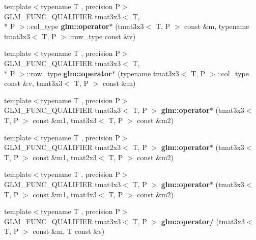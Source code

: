 \begin{DoxyCompactItemize}
\item 
\hypertarget{namespaceglm_a063060eed26a69cbc69ffd13b78263fd}{{\footnotesize template$<$typename T , precision P$>$ }\\G\-L\-M\-\_\-\-F\-U\-N\-C\-\_\-\-Q\-U\-A\-L\-I\-F\-I\-E\-R tmat3x3$<$ T, \\*
P $>$\-::col\-\_\-type {\bfseries glm\-::operator$\ast$} (tmat3x3$<$ T, P $>$ const \&m, typename tmat3x3$<$ T, P $>$\-::row\-\_\-type const \&v)}\label{namespaceglm_a063060eed26a69cbc69ffd13b78263fd}

\item 
\hypertarget{namespaceglm_a12af2d564dc38d2f7051131cd51d4c66}{{\footnotesize template$<$typename T , precision P$>$ }\\G\-L\-M\-\_\-\-F\-U\-N\-C\-\_\-\-Q\-U\-A\-L\-I\-F\-I\-E\-R tmat3x3$<$ T, \\*
P $>$\-::row\-\_\-type {\bfseries glm\-::operator$\ast$} (typename tmat3x3$<$ T, P $>$\-::col\-\_\-type const \&v, tmat3x3$<$ T, P $>$ const \&m)}\label{namespaceglm_a12af2d564dc38d2f7051131cd51d4c66}

\item 
\hypertarget{namespaceglm_aa501d4e3af1aca4edd6f5b6948003b32}{{\footnotesize template$<$typename T , precision P$>$ }\\G\-L\-M\-\_\-\-F\-U\-N\-C\-\_\-\-Q\-U\-A\-L\-I\-F\-I\-E\-R tmat3x3$<$ T, P $>$ {\bfseries glm\-::operator$\ast$} (tmat3x3$<$ T, P $>$ const \&m1, tmat3x3$<$ T, P $>$ const \&m2)}\label{namespaceglm_aa501d4e3af1aca4edd6f5b6948003b32}

\item 
\hypertarget{namespaceglm_a9c8814fa299560df98d85fac278b4368}{{\footnotesize template$<$typename T , precision P$>$ }\\G\-L\-M\-\_\-\-F\-U\-N\-C\-\_\-\-Q\-U\-A\-L\-I\-F\-I\-E\-R tmat2x3$<$ T, P $>$ {\bfseries glm\-::operator$\ast$} (tmat3x3$<$ T, P $>$ const \&m1, tmat2x3$<$ T, P $>$ const \&m2)}\label{namespaceglm_a9c8814fa299560df98d85fac278b4368}

\item 
\hypertarget{namespaceglm_a455124669156dc328dda186d05d35640}{{\footnotesize template$<$typename T , precision P$>$ }\\G\-L\-M\-\_\-\-F\-U\-N\-C\-\_\-\-Q\-U\-A\-L\-I\-F\-I\-E\-R tmat4x3$<$ T, P $>$ {\bfseries glm\-::operator$\ast$} (tmat3x3$<$ T, P $>$ const \&m1, tmat4x3$<$ T, P $>$ const \&m2)}\label{namespaceglm_a455124669156dc328dda186d05d35640}

\item 
\hypertarget{namespaceglm_ade5176afdca622b631e3d888fdf4123c}{{\footnotesize template$<$typename T , precision P$>$ }\\G\-L\-M\-\_\-\-F\-U\-N\-C\-\_\-\-Q\-U\-A\-L\-I\-F\-I\-E\-R tmat3x3$<$ T, P $>$ {\bfseries glm\-::operator/} (tmat3x3$<$ T, P $>$ const \&m, T const \&s)}\label{namespaceglm_ade5176afdca622b631e3d888fdf4123c}


\end{DoxyCompactItemize}
